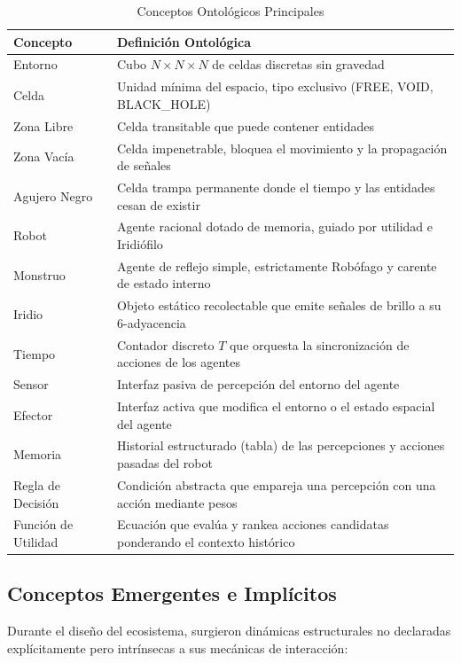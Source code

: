 \documentclass[conference]{IEEEtran}
\begin{document}
\begin{table}[htbp]
\caption{Conceptos Ontológicos Principales}
\begin{center}
\begin{tabular}{|l|>{\raggedright\arraybackslash}p{5cm}|}
\hline
\textbf{Concepto} & \textbf{Definición Ontológica} \\
\hline
Entorno & Cubo $N \times N \times N$ de celdas discretas sin gravedad \\
Celda & Unidad mínima del espacio, tipo exclusivo (FREE, VOID, BLACK\_HOLE) \\
Zona Libre & Celda transitable que puede contener entidades \\
Zona Vacía & Celda impenetrable, bloquea el movimiento y la propagación de señales \\
Agujero Negro & Celda trampa permanente donde el tiempo y las entidades cesan de existir \\
Robot & Agente racional dotado de memoria, guiado por utilidad e Iridiófilo \\
Monstruo & Agente de reflejo simple, estrictamente Robófago y carente de estado interno \\
Iridio & Objeto estático recolectable que emite señales de brillo a su $6$-adyacencia \\
Tiempo & Contador discreto $T$ que orquesta la sincronización de acciones de los agentes \\
Sensor & Interfaz pasiva de percepción del entorno del agente \\
Efector & Interfaz activa que modifica el entorno o el estado espacial del agente \\
Memoria & Historial estructurado (tabla) de las percepciones y acciones pasadas del robot \\
Regla de Decisión & Condición abstracta que empareja una percepción con una acción mediante pesos \\
Función de Utilidad & Ecuación que evalúa y rankea acciones candidatas ponderando el contexto histórico \\
\hline
\end{tabular}
\end{center}
\end{table}

\subsection{Conceptos Emergentes e Implícitos}
Durante el diseño del ecosistema, surgieron dinámicas estructurales no declaradas explícitamente pero intrínsecas a sus mecánicas de interacción:
\end{document}
